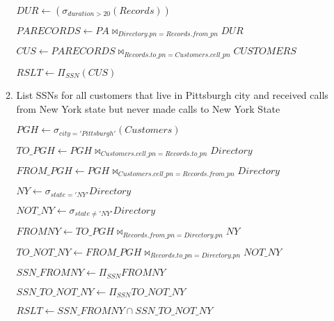 \documentclass[12pt]{article}
\begin{document}
\begin{enumerate}
\begin{enumerate}
$ DUR \leftarrow (\sigma_{duration > 20}(Records)) $

$ PARECORDS \leftarrow PA \bowtie_{Directory.pn = Records.from\_pn} DUR $ 

$ CUS \leftarrow PARECORDS \bowtie_{Records.to\_pn = Customers.cell\_pn} CUSTOMERS $

$ RSLT \leftarrow \Pi_{SSN}(CUS) $

\item
List SSNs for all customers that live in Pittsburgh city and received calls
from New York state but never made calls to New York State

$ PGH \leftarrow \sigma_{city='Pittsburgh'}(Customers) $

$ TO\_PGH \leftarrow PGH \bowtie_{Customers.cell\_pn = Records.to\_pn} Directory $

$ FROM\_PGH \leftarrow PGH \bowtie_{Customers.cell\_pn = Records.from\_pn} Directory $

$ NY \leftarrow \sigma_{state='NY'} Directory $

$ NOT\_NY \leftarrow \sigma_{state \neq 'NY'} Directory $

$ FROMNY \leftarrow TO\_PGH \bowtie_{Records.from\_pn = Directory.pn} NY $

$ TO\_NOT\_NY \leftarrow FROM\_PGH \bowtie_{Records.to\_pn = Directory.pn} NOT\_NY $

$ SSN\_FROMNY \leftarrow \Pi_{SSN} FROMNY $

$ SSN\_TO\_NOT\_NY \leftarrow \Pi_{SSN} TO\_NOT\_NY $

$ RSLT \leftarrow SSN\_FROMNY \cap SSN\_TO\_NOT\_NY $

\end{enumerate}


\end{enumerate}
\end{document}
